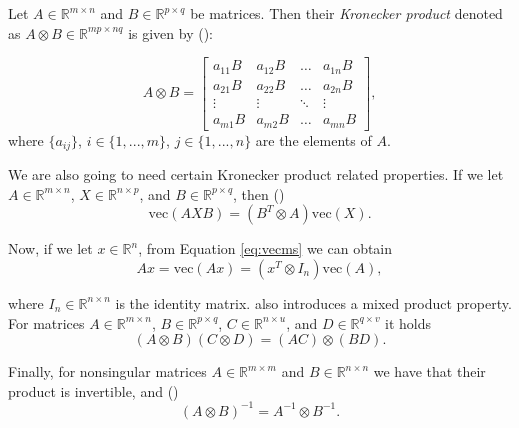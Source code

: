 \documentclass{mldsmsc}
\begin{document}
\begin{definition}
Let $A \in \mathbb{R}^{m \times n}$ and $B \in \mathbb{R}^{p \times q}$ be matrices. Then their \textit{Kronecker product} denoted as $A \otimes B \in \mathbb{R}^{mp \times nq}$ is given by (\cite{alma993596394401591}):

\begin{equation}
    A \otimes B = \begin{bmatrix}
        a_{11}B & a_{12}B & \hdots & a_{1n}B \\
        a_{21}B & a_{22}B & \hdots & a_{2n}B \\
        \vdots & \vdots & \ddots & \vdots \\
        a_{m1}B & a_{m2}B & \hdots & a_{mn}B
    \end{bmatrix},
\end{equation}
where $\{a_{ij}\}$, $i \in \{1,...,m\}$, $j \in \{1, ..., n\}$ are the elements of $A$.
\end{definition}

\noindent We are also going to need certain Kronecker product related properties. If we let $A \in \mathbb{R}^{m \times n}$, $X \in \mathbb{R}^{n \times p}$, and $B \in \mathbb{R}^{p \times q}$, then (\cite{alma993596394401591})
\begin{equation} \label{eq:vecms}
    \text{vec}(AXB) = (B^T \otimes A) \text{vec}(X). 
\end{equation}

\noindent Now, if we let $x \in \mathbb{R}^n$, from Equation \ref{eq:vecms} we can obtain
\begin{equation}
    Ax = \text{vec}(Ax) = (x^T \otimes I_n)\text{vec}(A),
\end{equation}

\noindent where $I_n \in \mathbb{R}^{n \times n}$ is the identity matrix. \cite{alma993596394401591} also introduces a mixed product property. For matrices $A \in \mathbb{R}^{m \times n}$, $B \in \mathbb{R}^{p \times q}$, $C \in \mathbb{R}^{n \times u}$, and $D \in \mathbb{R}^{q \times v}$ it holds 
\begin{equation}
    (A \otimes B)(C \otimes D) = (AC) \otimes (BD).
\end{equation}

\noindent Finally, for nonsingular matrices $A \in \mathbb{R}^{m \times m}$ and $B \in \mathbb{R}^{n \times n}$ we have that their product is invertible, and (\cite{alma993596394401591})
\begin{equation}
    (A \otimes B)^{-1} = A^{-1} \otimes B^{-1}.
\end{equation}
\end{document}
